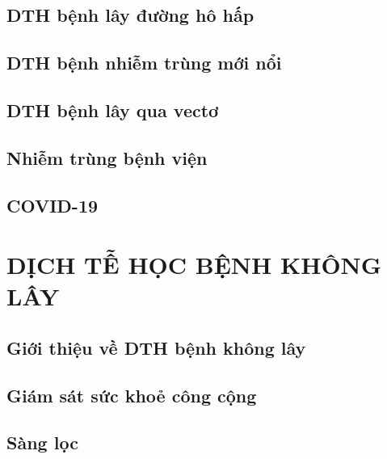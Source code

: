 \documentclass[
]{book}
\begin{document}
\hypertarget{dthbtn_hohap}{%
\chapter{DTH bệnh lây đường hô hấp}\label{dthbtn_hohap}}

\hypertarget{dthbtn_eid}{%
\chapter{DTH bệnh nhiễm trùng mới nổi}\label{dthbtn_eid}}

\hypertarget{dthbtn_vecto}{%
\chapter{DTH bệnh lây qua vectơ}\label{dthbtn_vecto}}

\hypertarget{dthbtn_ntbv}{%
\chapter{Nhiễm trùng bệnh viện}\label{dthbtn_ntbv}}

\hypertarget{dthbtn_covid}{%
\chapter{COVID-19}\label{dthbtn_covid}}

\hypertarget{part-dux1ecbch-tux1ec5-hux1ecdc-bux1ec7nh-khuxf4ng-luxe2y}{%
\part{DỊCH TỄ HỌC BỆNH KHÔNG LÂY}\label{part-dux1ecbch-tux1ec5-hux1ecdc-bux1ec7nh-khuxf4ng-luxe2y}}

\hypertarget{dthbkl_gioithieu}{%
\chapter{Giới thiệu về DTH bệnh không lây}\label{dthbkl_gioithieu}}

\hypertarget{dthbkl_giamsat}{%
\chapter{Giám sát sức khoẻ công cộng}\label{dthbkl_giamsat}}

\hypertarget{dthbkl_sangloc}{%
\chapter{Sàng lọc}\label{dthbkl_sangloc}}
\end{document}
